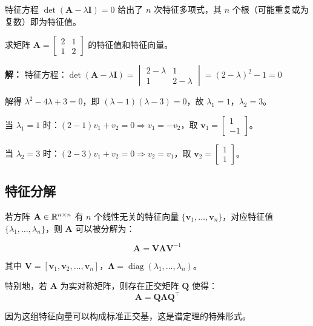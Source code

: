 特征方程 $\det(\mathbf{A}-\lambda\mathbf{I})=0$ 给出了 $n$ 次特征多项式，其 $n$ 个根（可能重复或为复数）即为特征值。

\begin{example}
求矩阵 $\mathbf{A}=\begin{bmatrix} 2 & 1 \\ 1 & 2 \end{bmatrix}$ 的特征值和特征向量。

\textbf{解：}
特征方程：$\det(\mathbf{A}-\lambda\mathbf{I})=\begin{vmatrix}2-\lambda & 1 \\ 1 & 2-\lambda\end{vmatrix}=(2-\lambda)^2-1=0$

解得 $\lambda^2-4\lambda+3=0$，即 $(\lambda-1)(\lambda-3)=0$，故 $\lambda_1=1$，$\lambda_2=3$。

当 $\lambda_1=1$ 时：$(2-1)v_1+v_2=0 \Rightarrow v_1=-v_2$，取 $\mathbf{v}_1=\begin{bmatrix}1 \\ -1\end{bmatrix}$。

当 $\lambda_2=3$ 时：$(2-3)v_1+v_2=0 \Rightarrow v_2=v_1$，取 $\mathbf{v}_2=\begin{bmatrix}1 \\ 1\end{bmatrix}$。
\end{example}

\subsection{特征分解}

若方阵 $\mathbf{A}\in\mathbb{R}^{n\times n}$ 有 $n$ 个线性无关的特征向量 $\{\mathbf{v}_1,\ldots,\mathbf{v}_n\}$，对应特征值 $\{\lambda_1,\ldots,\lambda_n\}$，则 $\mathbf{A}$ 可以被分解为：

\[
\mathbf{A} = \mathbf{V}\boldsymbol{\Lambda}\mathbf{V}^{-1}
\]

其中 $\mathbf{V}=[\mathbf{v}_1,\mathbf{v}_2,\ldots,\mathbf{v}_n]$，$\boldsymbol{\Lambda}=\operatorname{diag}(\lambda_1,\ldots,\lambda_n)$。

特别地，若 $\mathbf{A}$ 为实对称矩阵，则存在正交矩阵 $\mathbf{Q}$ 使得：
\[
\mathbf{A} = \mathbf{Q}\boldsymbol{\Lambda}\mathbf{Q}^{\top}
\]

因为这组特征向量可以构成标准正交基，这是谱定理的特殊形式。


